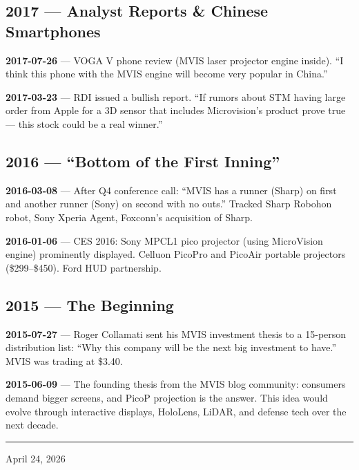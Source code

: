 \documentclass[11pt,letterpaper]{article}
\begin{document}
\subsection*{2017 --- Analyst Reports \& Chinese Smartphones}

{\color{datecyan}\textbf{2017-07-26}} --- VOGA V phone review (MVIS laser projector engine inside). ``I think this phone with the MVIS engine will become very popular in China.''

{\color{datecyan}\textbf{2017-03-23}} --- RDI issued a bullish report. ``If rumors about STM having large order from Apple for a 3D sensor that includes Microvision's product prove true --- this stock could be a real winner.''

\subsection*{2016 --- ``Bottom of the First Inning''}

{\color{datecyan}\textbf{2016-03-08}} --- After Q4 conference call: ``MVIS has a runner (Sharp) on first and another runner (Sony) on second with no outs.'' Tracked Sharp Robohon robot, Sony Xperia Agent, Foxconn's acquisition of Sharp.

{\color{datecyan}\textbf{2016-01-06}} --- CES 2016: Sony MPCL1 pico projector (using MicroVision engine) prominently displayed. Celluon PicoPro and PicoAir portable projectors (\$299--\$450). Ford HUD partnership.

\subsection*{2015 --- The Beginning}

{\color{datecyan}\textbf{2015-07-27}} --- Roger Collamati sent his MVIS investment thesis to a 15-person distribution list: ``Why this company will be the next big investment to have.'' MVIS was trading at \$3.40.

{\color{datecyan}\textbf{2015-06-09}} --- The founding thesis from the MVIS blog community: consumers demand bigger screens, and PicoP projection is the answer. This idea would evolve through interactive displays, HoloLens, LiDAR, and defense tech over the next decade.

\vspace{1em}
\hrule
\vspace{0.5em}
\begin{center}
{\small\color{dimgray} April 24, 2026}
\end{center}
\end{document}
